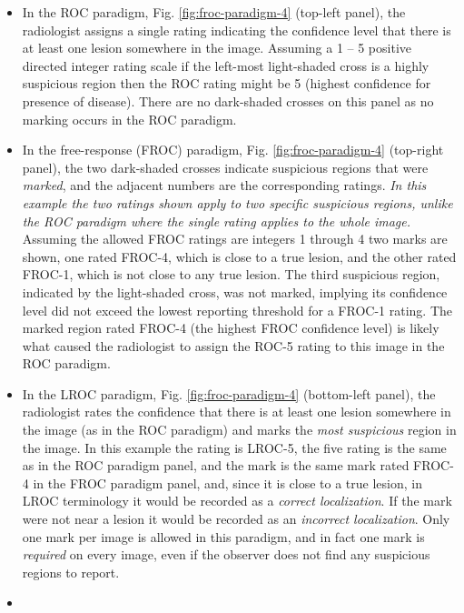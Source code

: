 \documentclass[
]{book}
\begin{document}
\begin{itemize}
\item
  In the ROC paradigm, Fig. \ref{fig:froc-paradigm-4} (top-left panel), the radiologist assigns a single rating indicating the confidence level that there is at least one lesion somewhere in the image. Assuming a 1 -- 5 positive directed integer rating scale if the left-most light-shaded cross is a highly suspicious region then the ROC rating might be 5 (highest confidence for presence of disease). There are no dark-shaded crosses on this panel as no marking occurs in the ROC paradigm.
\item
  In the free-response (FROC) paradigm, Fig. \ref{fig:froc-paradigm-4} (top-right panel), the two dark-shaded crosses indicate suspicious regions that were \emph{marked}, and the adjacent numbers are the corresponding ratings. \emph{In this example the two ratings shown apply to two specific suspicious regions, unlike the ROC paradigm where the single rating applies to the whole image.} Assuming the allowed FROC ratings are integers 1 through 4 two marks are shown, one rated FROC-4, which is close to a true lesion, and the other rated FROC-1, which is not close to any true lesion. The third suspicious region, indicated by the light-shaded cross, was not marked, implying its confidence level did not exceed the lowest reporting threshold for a FROC-1 rating. The marked region rated FROC-4 (the highest FROC confidence level) is likely what caused the radiologist to assign the ROC-5 rating to this image in the ROC paradigm.
\item
  In the LROC paradigm, Fig. \ref{fig:froc-paradigm-4} (bottom-left panel), the radiologist rates the confidence that there is at least one lesion somewhere in the image (as in the ROC paradigm) and marks the \emph{most suspicious} region in the image. In this example the rating is LROC-5, the five rating is the same as in the ROC paradigm panel, and the mark is the same mark rated FROC-4 in the FROC paradigm panel, and, since it is close to a true lesion, in LROC terminology it would be recorded as a \emph{correct localization}. If the mark were not near a lesion it would be recorded as an \emph{incorrect localization}. Only one mark per image is allowed in this paradigm, and in fact one mark is \emph{required} on every image, even if the observer does not find any suspicious regions to report.
\item

\end{itemize}
\end{document}
